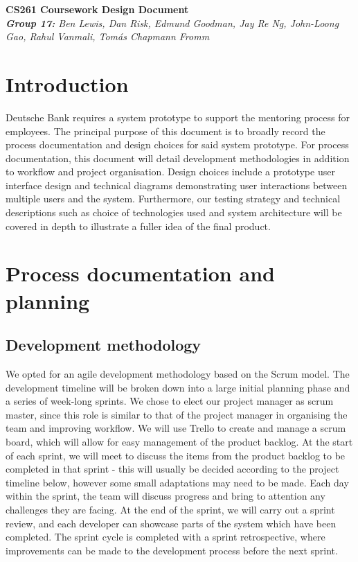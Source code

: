 \documentclass[10pt]{article}
\begin{document}
\begin{center}
    \Huge\textbf{CS261 Coursework Design Document}\\
    \vspace{2mm}
    \large{\textit{\textbf{Group 17:} Ben Lewis, Dan Risk, Edmund Goodman,
    Jay Re Ng, John-Loong Gao, Rahul Vanmali, Tomás Chapmann Fromm}}
\end{center}


\section{Introduction}
Deutsche Bank requires a system prototype to support the mentoring process for
employees. The principal purpose of this document is to broadly record the
process documentation and design choices for said system prototype. For process
documentation, this document will detail development methodologies in addition
to workflow and project organisation. Design choices include a prototype user
interface design and technical diagrams demonstrating user interactions between
multiple users and the system. Furthermore, our testing strategy and technical
descriptions such as choice of technologies used and system architecture will be
covered in depth to illustrate a fuller idea of the final product.

\section{Process documentation and planning}
\subsection{Development methodology}
We opted for an agile development methodology based on the Scrum model. The
development timeline will be broken down into a large initial planning phase and
a series of week-long sprints. We chose to elect our project manager as scrum
\cite{scrum} master, since this role is similar to that of the project manager
in organising the team and improving workflow. We will use Trello \cite{trello}
to create and manage a scrum board, which will allow for easy management of the
product backlog. At the start of each sprint, we will meet to discuss the items
from the product backlog to be completed in that sprint - this will usually be
decided according to the project timeline below, however some small adaptations
may need to be made. Each day within the sprint, the team will discuss progress
and bring to attention any challenges they are facing. At the end of the sprint,
we will carry out a sprint review, and each developer can showcase parts of the
system which have been completed. The sprint cycle is completed with a sprint
retrospective, where improvements can be made to the development process before
the next sprint.
\end{document}
